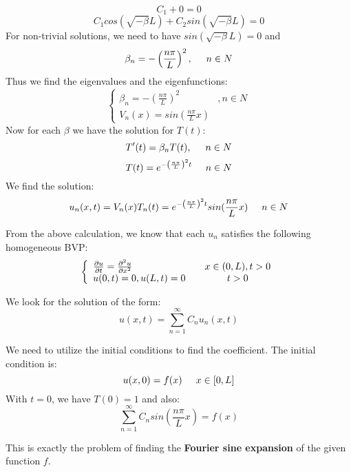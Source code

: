 \documentclass[12pt]{article} %
\begin{document}
$$
C_{1} + 0 = 0
$$
$$
C_{1} cos (\sqrt{-\beta }L) + C_{2} sin (\sqrt{-\beta }L) = 0
$$
For non-trivial solutions, we need to have $sin (\sqrt{-\beta }L) = 0$ and 
$$
\beta_{n} = - \left(
\frac{n \pi}{L}
\right)^{2}, \hspace{5mm} n \in N
$$Thus we find the eigenvalues and the eigenfunctions:
\begin{equation}
 \left\{
 \begin{array}{lcc}
 \beta_{n} = - \left(
\frac{n \pi}{L}
\right)^{2} &, n \in N \\
V_{n}(x) = sin(\frac{n\pi}{L}x)
 \end{array} \right.
\end{equation}
Now for each $\beta$ we have the solution for $T(t)$:
$$
T'(t) = \beta_{n}T(t), \hspace{5mm}  n \in N
$$
$$
T(t) = e^{ - \left(
\frac{n \pi}{L}
\right)^{2}t} \hspace{5mm} n \in N
$$
We find the solution:
\begin{equation}
u_{n}(x, t) = V_{n}(x)T_{n}(t) = e^{ - \left(
\frac{n \pi}{L}
\right)^{2}t}sin(\frac{n\pi}{L}x) \hspace{5mm} n\in N
\end{equation}\par
From the above calculation, we know that each $u_{n}$ satisfies the following homogeneous BVP:
\begin{equation}
\left \{ \begin{array}{llc}
\pdv{u}{t} =\frac{\partial^{2}u}{\partial x^{2}} & & x \in (0,L),  t>0 \\
u(0,t) = 0, u(L, t) = 0 && t>0 
\end{array}\right.
\end{equation}\par
We look for the solution of the form:
\begin{equation}
u(x, t) = \sum_{n=1}^{\infty}C_{n}u_{n}(x, t)
\end{equation}\par
We need to utilize the initial conditions to find the coefficient. The initial condition is:
$$
u(x, 0) = f(x) \hspace{5mm} x \in [0, L]
$$
With $t = 0$, we have $T(0) = 1$ and also:
\begin{equation}
\sum_{n=1}^{\infty}C_{n}sin(\frac{n\pi}{L}x) = f(x)
\end{equation}\par
This is exactly the problem of finding the \textbf{Fourier sine expansion} of the given function $f$.\par
\end{document}
